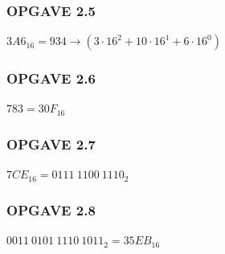     
\subsubsection{OPGAVE 2.5}
$3A6_16 = 934\rightarrow (3 \cdot 16^2 + 10 \cdot 16^1 + 6 \cdot 16^0)$

\subsubsection{OPGAVE 2.6}
$783 = 30F_16$

\subsubsection{OPGAVE 2.7}
$7CE_16 = 0111\ 1100\ 1110_2$

\subsubsection{OPGAVE 2.8}
$0011\ 0101\ 1110\ 1011_2 = 35EB_16$
    
    
    
